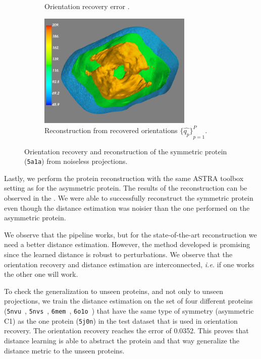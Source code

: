\begin{figure}[ht!]
\begin{subfigure}[b]{0.45\textwidth}
        \caption{Orientation recovery error .}
    \end{subfigure}
    \hfill
    \begin{subfigure}[b]{0.45\textwidth}
        \centering
        \includegraphics[height=5.5cm]{figures/5a1a_aligned}
        \caption{Reconstruction from recovered orientations ${\big\{\widehat{q_p}\big\}}_{p=1}^P$.}
    \end{subfigure}
    \caption{
        Orientation recovery and reconstruction of the symmetric protein (\texttt{5a1a}) from noiseless projections.
    }\label{fig:5a1a-orientation-recovery-loss}
    \label{fig:angle-alignment-5a1a-noise0}
    \label{fig:5a1a-reconstruction-noise0}
\end{figure}

Lastly, we perform the protein reconstruction with the same ASTRA toolbox setting as for the asymmetric protein. The results of the reconstruction can be observed in the .
We were able to successfully reconstruct the symmetric protein even though the distance estimation was noisier than the one performed on the asymmetric protein.

We observe that the pipeline works, but for the state-of-the-art reconstruction we need a better distance estimation.
However, the method developed is promising since the learned distance is robust to perturbations.
We observe that the orientation recovery and distance estimation are interconnected, \textit{i.e.} if one works the other one will work.

To check the generalization to unseen proteins, and not only to  unseen projections, we train the distance estimation on the set of four different proteins (\texttt{5nvu}~\cite{5nvu_pdb}, \texttt{5nvs}~\cite{5nvs_pdb}, \texttt{6mem}~\cite{6mem_pdb}, \texttt{6o1o}~\cite{6o1o_pdb}) that have the same type of symmetry (asymmetric  C1) as the one protein (\texttt{5j0n}) in the test dataset that is used in orientation recovery.
The orientation recovery reaches the error of 0.0352. 
This proves that distance learning is able to abstract the protein and that way generalize the distance metric to the unseen proteins.
